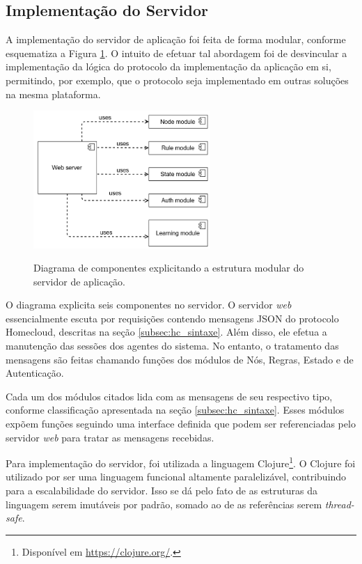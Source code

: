 \subsection{Implementação do Servidor}
A implementação do servidor de aplicação foi feita de forma modular, conforme esquematiza a Figura \ref{fig:componentes_servidor}. O intuito de efetuar tal abordagem foi de desvincular a implementação da lógica do protocolo da implementação da aplicação em si, permitindo, por exemplo, que o protocolo seja implementado em outras soluções na mesma plataforma.

\begin{figure}[h]
	\centering
	\caption{Diagrama de componentes explicitando a estrutura modular do servidor de aplicação.}
  \includegraphics[width=0.6\textwidth]{imagens/componentes_servidor.png}
  \label{fig:componentes_servidor}  
\end{figure}

O diagrama explicita seis componentes no servidor. O servidor \textit{web} essencialmente escuta por requisições contendo mensagens JSON do protocolo Homecloud, descritas na seção \ref{subsec:hc_sintaxe}. Além disso, ele efetua a manutenção das sessões dos agentes do sistema. No entanto, o tratamento das mensagens são feitas chamando funções dos módulos de Nós, Regras, Estado e de Autenticação.

Cada um dos módulos citados lida com as mensagens de seu respectivo tipo, conforme classificação apresentada na seção \ref{subsec:hc_sintaxe}. Esses módulos expõem funções seguindo uma interface definida que podem ser referenciadas pelo servidor \textit{web} para tratar as mensagens recebidas.

Para implementação do servidor, foi utilizada a linguagem Clojure\footnote{Disponível em \url{https://clojure.org/}.}. O Clojure foi utilizado por ser uma linguagem funcional altamente paralelizável, contribuindo para a escalabilidade do servidor. Isso se dá pelo fato de as estruturas da linguagem serem imutáveis por padrão, somado ao de as referências serem \textit{thread-safe}.

